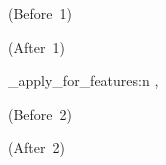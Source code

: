 \documentclass[a4paper]{delta-modules-packagedoc}
\begin{document}
	\noindent(Before~1)    \par
	\noindent\vIntroduction\par
	\noindent(After~1)     \par
	
	\delta_apply_for_features:n {\fDeltaLogic, \fThesis}

	\noindent(Before~2)    \par
	\noindent\vIntroduction\par
	\noindent(After~2)     \par
	
	\vTest
	
\ExplSyntaxOff

\end{document}
